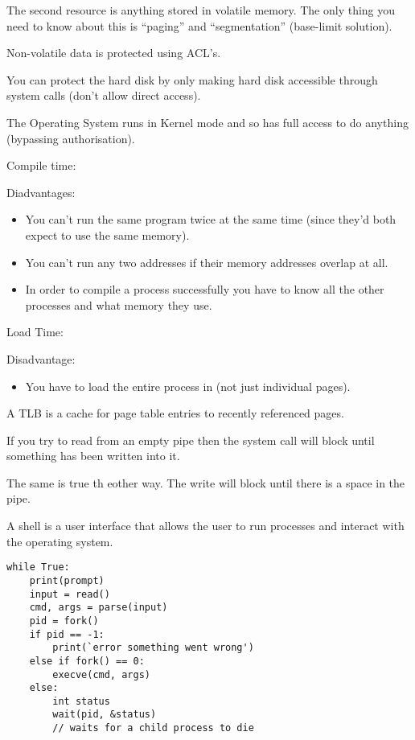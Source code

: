 \documentclass[10pt,\jkfside,a4paper]{article}
\begin{document}
The second resource is anything stored in volatile memory. 
The only thing you need to know about this is ``paging'' and ``segmentation'' (base-limit solution).

Non-volatile data is protected using ACL's.

You can protect the hard disk by only making hard disk accessible through system calls (don't allow 
direct access).

The Operating System runs in Kernel mode and so has full access to do anything (bypassing authorisation).

Compile time:

Diadvantages:

\begin{itemize}

\item You can't run the same program twice at the same time (since they'd both expect to 
use the same memory).

\item You can't run any two addresses if their memory addresses overlap at all.

\item In order to compile a process successfully you have to know all the other processes and what memory 
they use.

\end{itemize}

Load Time:

Disadvantage:

\begin{itemize}

\item You have to load the entire process in (not just individual pages).

\end{itemize}

A TLB is a cache for page table entries to recently referenced pages.

If you try to read from an empty pipe then the system call will block until something has been 
written into it.

The same is true th eother way. The write will block until there is a space in the 
pipe.

A shell is a user interface that allows the user to run processes and interact with the 
operating system.

\begin{lstlisting}
while True:
	print(prompt)
	input = read()
	cmd, args = parse(input)
	pid = fork()
	if pid == -1:
		print(`error something went wrong')
	else if fork() == 0:
		execve(cmd, args)
	else:
		int status
		wait(pid, &status)
		// waits for a child process to die
\end{lstlisting}
\end{document}
